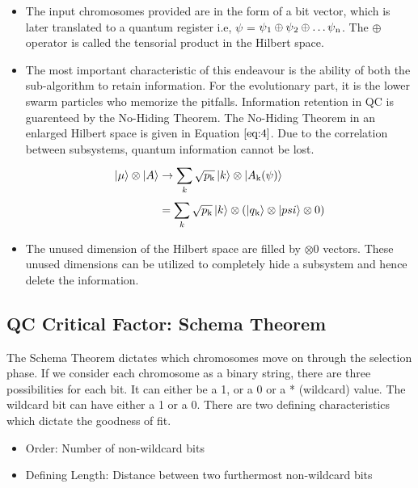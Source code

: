 \documentclass[conference]{IEEEtran}
\begin{document}
\begin{itemize}
\item The input chromosomes provided are in the form of a bit vector, which is later translated to a quantum register i.e, $\psi$ = $\psi\textsubscript{1} \oplus \psi\textsubscript{2} \oplus \dots \psi\textsubscript{n}$. The $\oplus$ operator is called the tensorial product in the Hilbert space.

\item The most important characteristic of this endeavour is the ability of both the sub-algorithm to retain information. For the evolutionary part, it is the lower swarm particles who memorize the pitfalls. Information retention in QC is guarenteed by the No-Hiding Theorem. The No-Hiding Theorem in an enlarged Hilbert space is given in Equation $\ref{eq:4}$. Due to the correlation between subsystems, quantum information cannot be lost. 
{\scriptsize
\begin{equation}
\label{eq:4}
\begin{split}
\ket{\mu} \otimes \ket{A} & \rightarrow \sum_{k}^{}\sqrt{p\textsubscript{k}}\ket{k} \otimes \ket{A\textsubscript{k}(\psi)}\\
& = \sum_{k}^{}\sqrt{p\textsubscript{k}}\ket{k} \otimes (\ket{q\textsubscript{k}} \otimes \ket{psi} \otimes 0)
\end{split}
\end{equation}
}%
\item The unused dimension of the Hilbert space are filled by $\otimes 0$ vectors. These unused dimensions can be utilized to completely hide a subsystem and hence delete the information.
\end{itemize}

\subsection{QC Critical Factor: Schema Theorem}
The Schema Theorem \cite{st} dictates which chromosomes move on through the selection phase. If we consider each chromosome as a binary string, there are three possibilities for each bit. It can either be a 1, or a 0 or a * (wildcard) value. The wildcard bit can have either a 1 or a 0. There are two defining characteristics which dictate the goodness of fit. 

\begin{itemize}
\item Order: Number of non-wildcard bits 
\item Defining Length: Distance between two furthermost non-wildcard bits
\end{itemize}
\end{document}
